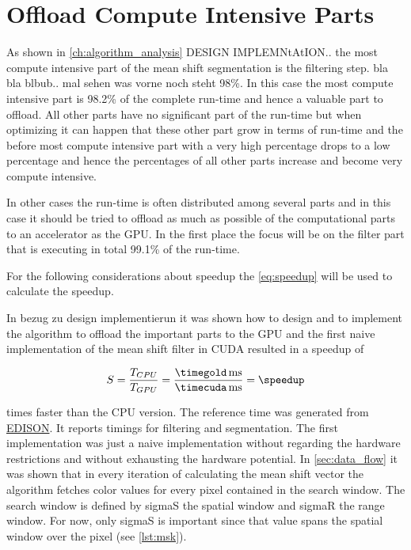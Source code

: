 \section{Offload Compute Intensive Parts}
\label{sec:offload_intensive}
\fpDiv{\speedup}{\timegold}{\timecuda}

As shown in \autoref{ch:algorithm_analysis} {\color{red} DESIGN IMPLEMNtAtION..}
the most compute intensive part of the mean shift segmentation is the filtering
step. bla bla blbub.. mal sehen was vorne noch steht 98\%. In this case the most
compute intensive part is 98.2\% of the complete run-time and hence a valuable
part to offload. All other parts have no significant part of the run-time but
when optimizing it can happen that these other part grow in terms of run-time
and the before most compute intensive part with a very high percentage drops to
a low percentage and hence the percentages of all other parts increase and
become very compute intensive. 

In other cases the run-time is often distributed among several parts and in this
case it should be tried to offload as much as possible of the computational parts
to an accelerator as the \gls{GPU}. In the first place the focus will be on the
filter part that is executing in total 99.1\% of the run-time.

For the following considerations about speedup the \autoref{eq:speedup} will be
used to calculate the speedup. 

In {\color{red} bezug zu design implementierun} it was shown how to design and
to implement the algorithm to offload the important parts to the \gls{GPU} and
the first naive implementation of the mean shift filter in \gls{CUDA} resulted
in a speedup of

\begin{equation*}\label{eq:speedup0}
	S = \frac{T_{CPU}}{T_{GPU}} = %
	\frac{\unit[\timegold]{ms}}{\unit[\timecuda]{ms}} = \speedup
\end{equation*}

times faster than the \gls{CPU} version. The reference time was generated from
\href{http://www.caip.rutgers.edu/riul/research/code.html}{ \gls{EDISON}}. It
reports timings for filtering and segmentation.
The first implementation was just a naive implementation without regarding the
hardware restrictions and without exhausting the hardware potential. In
\autoref{sec:data_flow} it was shown that in every iteration of calculating the
mean shift vector the algorithm fetches color values for every pixel contained
in the search window. The search window is defined by \textsf{sigmaS} the
spatial window and \textsf{sigmaR} the range window. For now, only
\textsf{sigmaS} is important since that value spans the spatial window over
the pixel (see \autoref{lst:msk}). 




